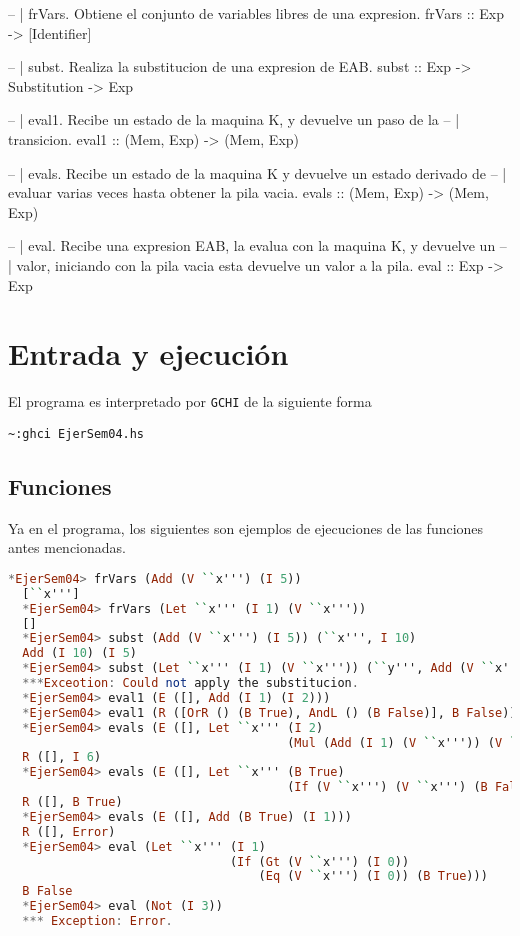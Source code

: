 \documentclass[spanish,12pt,letterpaper]{article}
\begin{document}
\begin{code}
   -- | frVars. Obtiene el conjunto de variables libres de una expresion.
   frVars :: Exp -> [Identifier]
  
   -- | subst. Realiza la substitucion de una expresion de EAB.
   subst :: Exp -> Substitution -> Exp

   -- | eval1. Recibe un estado de la maquina K, y devuelve un paso de la
   -- |        transicion.
   eval1 :: (Mem, Exp) -> (Mem, Exp)

   -- | evals. Recibe un estado de la maquina K y devuelve un estado derivado de
   -- |        evaluar varias veces hasta obtener la pila vacia.
   evals :: (Mem, Exp) -> (Mem, Exp)

  -- | eval. Recibe una expresion EAB, la evalua con la maquina K, y devuelve un
  -- |       valor, iniciando con la pila vacia esta devuelve un valor a la pila.
   eval :: Exp -> Exp

\end{code}

\section{Entrada y ejecución}

El programa es interpretado por \texttt{GCHI} de la siguiente forma
\begin{lstlisting}[]
  ~:ghci EjerSem04.hs
\end{lstlisting}

\subsection{Funciones}
Ya en el programa, los siguientes son ejemplos de ejecuciones de las funciones
antes mencionadas.

\begin{lstlisting}[language=Haskell]
  *EjerSem04> frVars (Add (V ``x''') (I 5))
  [``x''']
  *EjerSem04> frVars (Let ``x''' (I 1) (V ``x'''))
  []
  *EjerSem04> subst (Add (V ``x''') (I 5)) (``x''', I 10)
  Add (I 10) (I 5)
  *EjerSem04> subst (Let ``x''' (I 1) (V ``x''')) (``y''', Add (V ``x''') (I 5))
  ***Exceotion: Could not apply the substitucion.
  *EjerSem04> eval1 (E ([], Add (I 1) (I 2)))
  *EjerSem04> eval1 (R ([OrR () (B True), AndL () (B False)], B False))
  *EjerSem04> evals (E ([], Let ``x''' (I 2) 
                                       (Mul (Add (I 1) (V ``x''')) (V ``x'''))))
  R ([], I 6)
  *EjerSem04> evals (E ([], Let ``x''' (B True) 
                                       (If (V ``x''') (V ``x''') (B False))))
  R ([], B True)
  *EjerSem04> evals (E ([], Add (B True) (I 1)))
  R ([], Error)
  *EjerSem04> eval (Let ``x''' (I 1)
                               (If (Gt (V ``x''') (I 0)) 
                                   (Eq (V ``x''') (I 0)) (B True)))
  B False
  *EjerSem04> eval (Not (I 3))
  *** Exception: Error.

\end{lstlisting}
\end{document}

